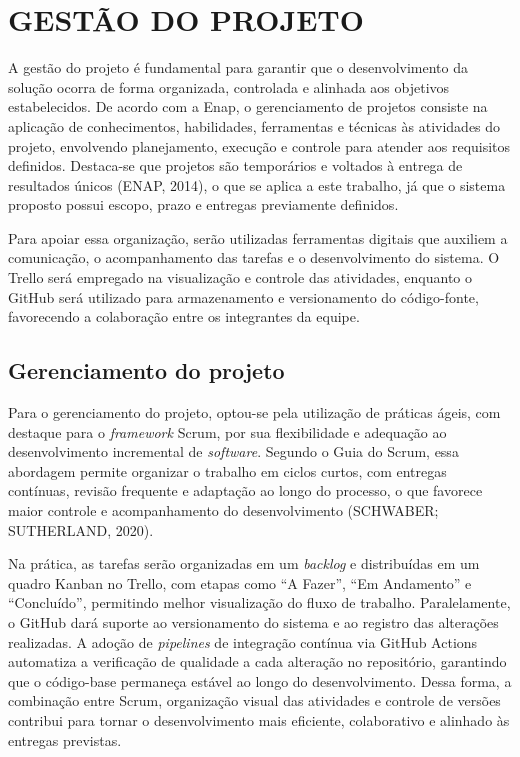 \chapter{GESTÃO DO PROJETO}

A gestão do projeto é fundamental para garantir que o desenvolvimento da solução ocorra de forma organizada, controlada e alinhada aos objetivos estabelecidos. De acordo com a Enap, o gerenciamento de projetos consiste na aplicação de conhecimentos, habilidades, ferramentas e técnicas às atividades do projeto, envolvendo planejamento, execução e controle para atender aos requisitos definidos. Destaca-se que projetos são temporários e voltados à entrega de resultados únicos (ENAP, 2014), o que se aplica a este trabalho, já que o sistema proposto possui escopo, prazo e entregas previamente definidos.

Para apoiar essa organização, serão utilizadas ferramentas digitais que auxiliem a comunicação, o acompanhamento das tarefas e o desenvolvimento do sistema. O Trello será empregado na visualização e controle das atividades, enquanto o GitHub será utilizado para armazenamento e versionamento do código-fonte, favorecendo a colaboração entre os integrantes da equipe.

\section{Gerenciamento do projeto}

Para o gerenciamento do projeto, optou-se pela utilização de práticas ágeis, com destaque para o \textit{framework} Scrum, por sua flexibilidade e adequação ao desenvolvimento incremental de \textit{software}. Segundo o Guia do Scrum, essa abordagem permite organizar o trabalho em ciclos curtos, com entregas contínuas, revisão frequente e adaptação ao longo do processo, o que favorece maior controle e acompanhamento do desenvolvimento (SCHWABER; SUTHERLAND, 2020).

Na prática, as tarefas serão organizadas em um \textit{backlog} e distribuídas em um quadro Kanban no Trello, com etapas como ``A Fazer'', ``Em Andamento'' e ``Concluído'', permitindo melhor visualização do fluxo de trabalho. Paralelamente, o GitHub dará suporte ao versionamento do sistema e ao registro das alterações realizadas. A adoção de \textit{pipelines} de integração contínua via GitHub Actions automatiza a verificação de qualidade a cada alteração no repositório, garantindo que o código-base permaneça estável ao longo do desenvolvimento. Dessa forma, a combinação entre Scrum, organização visual das atividades e controle de versões contribui para tornar o desenvolvimento mais eficiente, colaborativo e alinhado às entregas previstas.

